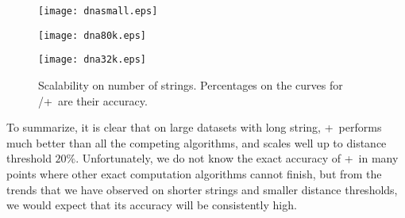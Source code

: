 \begin{figure*}[t]
\centering
\begin{minipage}[d]{0.32\linewidth}
\centering
\texttt{[image: dnasmall.eps]}
\centerline{\genob}
\end{minipage}
\begin{minipage}[d]{0.32\linewidth}
\centering
\texttt{[image: dna80k.eps]}
\centerline{\genoe}
\end{minipage}
\begin{minipage}[d]{0.32\linewidth}
\centering
\texttt{[image: dna32k.eps]}
\centerline{\genof}
\end{minipage}
\caption{Scalability on number of strings. Percentages on the curves for \ebdjoin/\ebdjoin+\  are their accuracy. }
\label{fig:scalen}
\end{figure*}


To summarize, it is clear that on large datasets with long string,  \ebdjoin+\ performs much better than all the competing algorithms, and scales well up to distance threshold $20\%$.  Unfortunately, we do not know the exact accuracy of \ebdjoin+\ in many points where other exact computation algorithms cannot finish, but from the trends that we have observed on shorter strings and smaller distance thresholds, we would expect that its accuracy will be consistently high. 










